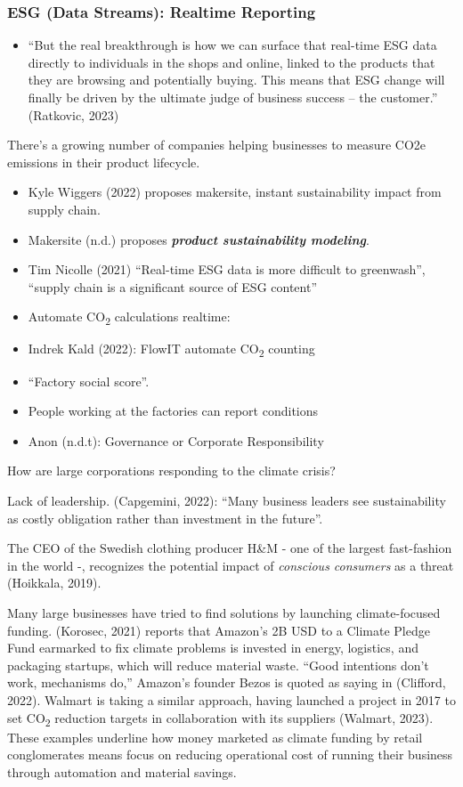 \documentclass[
  letterpaper,
  DIV=11,
  numbers=noendperiod]{scrartcl}
\providecommand{\tightlist}{%
  \setlength{\itemsep}{0pt}\setlength{\parskip}{0pt}}\usepackage{longtable,booktabs,array}
\begin{document}
\subsubsection{ESG (Data Streams): Realtime
Reporting}\label{esg-data-streams-realtime-reporting}

\begin{itemize}
\tightlist
\item
  ``But the real breakthrough is how we can surface that real-time ESG
  data directly to individuals in the shops and online, linked to the
  products that they are browsing and potentially buying. This means
  that ESG change will finally be driven by the ultimate judge of
  business success -- the customer.'' (Ratkovic, 2023)
\end{itemize}

There's a growing number of companies helping businesses to measure CO2e
emissions in their product lifecycle.

\begin{itemize}
\item
  Kyle Wiggers (2022) proposes makersite, instant sustainability impact
  from supply chain.
\item
  Makersite (n.d.) proposes \textbf{\emph{product sustainability
  modeling}}.
\item
  Tim Nicolle (2021) ``Real-time ESG data is more difficult to
  greenwash'', ``supply chain is a significant source of ESG content''
\item
  Automate CO\textsubscript{2} calculations realtime:
\item
  Indrek Kald (2022): FlowIT automate CO\textsubscript{2} counting
\item
  ``Factory social score''.
\item
  People working at the factories can report conditions
\item
  Anon (n.d.t): Governance or Corporate Responsibility
\end{itemize}

How are large corporations responding to the climate crisis?

Lack of leadership. (Capgemini, 2022): ``Many business leaders see
sustainability as costly obligation rather than investment in the
future''.

The CEO of the Swedish clothing producer H\&M - one of the largest
fast-fashion in the world -, recognizes the potential impact of
\emph{conscious consumers} as a threat (Hoikkala, 2019).

Many large businesses have tried to find solutions by launching
climate-focused funding. (Korosec, 2021) reports that Amazon's 2B USD to
a Climate Pledge Fund earmarked to fix climate problems is invested in
energy, logistics, and packaging startups, which will reduce material
waste. ``Good intentions don't work, mechanisms do,'' Amazon's founder
Bezos is quoted as saying in (Clifford, 2022). Walmart is taking a
similar approach, having launched a project in 2017 to set
CO\textsubscript{2} reduction targets in collaboration with its
suppliers (Walmart, 2023). These examples underline how money marketed
as climate funding by retail conglomerates means focus on reducing
operational cost of running their business through automation and
material savings.
\end{document}
